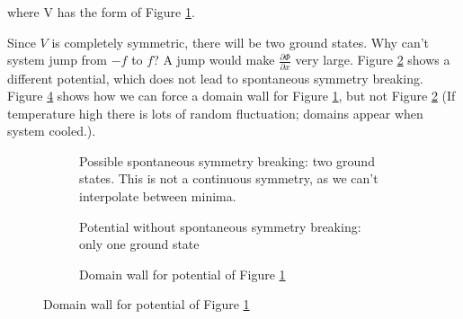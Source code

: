 \documentclass[]{article}
\begin{document}
where V has the form of Figure \ref{fig:2-7-V}.

Since $V$ is completely symmetric, there will be two ground states. Why can't system jump from $-f$ to $f$? A jump would make $\frac{\partial \Phi}{\partial x}$ very large. Figure \ref{fig:2-7-V-simple} shows a different potential, which does not lead to spontaneous symmetry breaking. Figure \ref{fig:2-7-V-domain-wall} shows how we can force a domain wall for Figure \ref{fig:2-7-V}, but not Figure \ref{fig:2-7-V-simple} (If temperature high there is lots of random fluctuation; domains appear when system cooled.).

\begin{figure}[H]
	\caption[$V(\Phi)$ with and without spontaneous symmetry breaking]{Potential for (\ref{eq:spontaneous:symmetry:L}), with and without spontaneous symmetry breaking}
	\begin{subfigure}[t]{0.45\textwidth}
		\vskip 0pt
		\caption{Possible spontaneous symmetry breaking: two ground states. This is not a continuous symmetry, as we can't interpolate between minima.}\label{fig:2-7-V}
	\end{subfigure}
	\hfill
	\begin{subfigure}[t]{0.45\textwidth}
		\vskip 0pt
		\caption{Potential without spontaneous symmetry breaking: only one ground state}\label{fig:2-7-V-simple}
	\end{subfigure}
	
	\begin{subfigure}[t]{0.9\textwidth}
		\begin{center}
			\caption{Domain wall for potential of Figure \ref{fig:2-7-V}}\label{fig:2-7-V-domain-wall}
		\end{center}
	\end{subfigure}
\end{figure}
\end{document}
